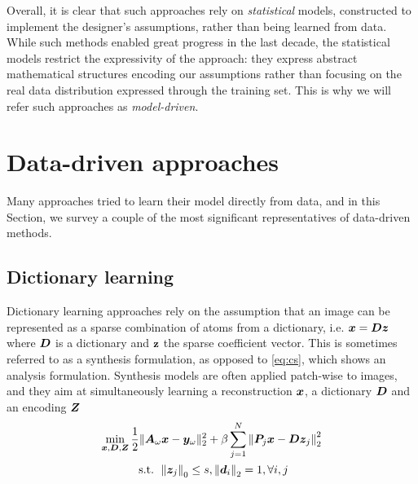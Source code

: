 Overall, it is clear that such approaches rely on \textit{statistical} models, constructed to implement the designer's assumptions, rather than being learned from data. While such methods enabled great progress in the last decade, the statistical models restrict the expressivity of the approach: they express abstract mathematical structures encoding our assumptions rather than focusing on the real data distribution expressed through the training set. This is why we will refer such approaches as \textit{model-driven}.


\section{Data-driven approaches}
Many approaches tried to learn their model directly from data, and in this Section, we survey a couple of the most significant representatives of data-driven methods.

\subsection{Dictionary learning}
Dictionary learning approaches rely on the assumption that an image can be represented as a sparse combination of atoms from a dictionary, i.e. ${\bm{x}} ={\bm{D}}{\bm{z}}$ where ${\bm{D}}$ is a dictionary and $\mathbf{z}$ the sparse coefficient vector. This is sometimes referred to as a synthesis formulation, as opposed to \ref{eq:cs}, which shows an analysis formulation. Synthesis models are often applied patch-wise to images, and they aim at simultaneously learning a reconstruction ${\bm{x}}$, a dictionary ${\bm{D}}$ and an encoding ${\bm{Z}}$ \citep{ravishankar2011mr,caballero2014dictionary}
\begin{equation}
\begin{gathered}
    \min _{{\bm{x}}, {\bm{D}}, {\bm{Z}}} \frac{1}{2}\|{\bm{A}}_\omega{\bm{x}}-{\bm{y}}_\omega\|_{2}^{2}+\beta \sum_{j=1}^{N}\left\|{\bm{P}}_j {\bm{x}}-{\bm{D}} {\bm{z}}_{j}\right\|_{2}^{2} \\
    \text { s.t. }\left\|{\bm{z}}_{j}\right\|_{0} \leq s,\left\|{\bm{d}}_{i}\right\|_{2}=1, \forall i, j
\end{gathered}
\end{equation}
